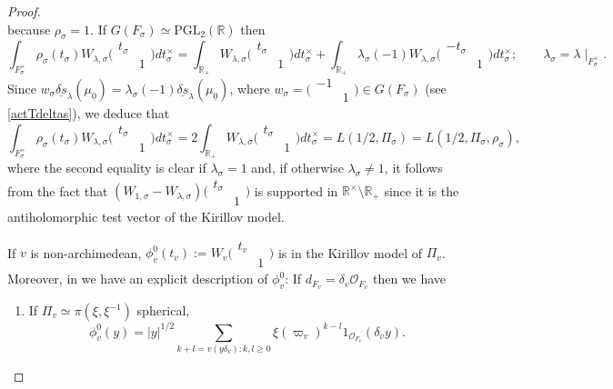 \documentclass{amsart}
\theoremstyle{definition}
\theoremstyle{remark}
\numberwithin{equation}{section}
\newcommand{\PGL}{{\mathrm{PGL}}}
\newcommand{\R}{{\mathbb R}}
\newcommand{\cO}{{\mathcal O}}
\begin{document}
\begin{proof}
\[\]
because $\rho_\sigma=1$.
If $G(F_\sigma)\simeq\PGL_2(\R)$ then
\[
\int_{F_\sigma^\times}\rho_\sigma(t_\sigma)W_{\lambda,\sigma}\big(\begin{smallmatrix}t_\sigma     &  \\     & 1    
\end{smallmatrix}\big)dt_\sigma^\times=\int_{\R_+}W_{\lambda,\sigma}\big(\begin{smallmatrix}t_\sigma     &  \\     & 1    
\end{smallmatrix}\big)dt_\sigma^\times+\int_{\R_+}\lambda_\sigma(-1)W_{\lambda,\sigma}\big(\begin{smallmatrix}-t_\sigma     &  \\     & 1    
\end{smallmatrix}\big)dt_\sigma^\times;\qquad\lambda_\sigma=\lambda\mid_{F_\sigma^\times}.
\]
Since $w_\sigma \underline{\delta s}_\lambda(\mu_{\underline{0}})=\lambda_\sigma(-1)\underline{\delta s}_\lambda(\mu_{\underline{0}})$, where $w_\sigma=\big(\begin{smallmatrix}-1     &  \\     & 1    
\end{smallmatrix}\big)\in G(F_\sigma)$ (see \eqref{actTdeltas}), we deduce that 
\[
\int_{F_\sigma^\times}\rho_\sigma(t_\sigma)W_{\lambda,\sigma}\big(\begin{smallmatrix}t_\sigma     &  \\     & 1    
\end{smallmatrix}\big)dt_\sigma^\times=2\int_{\R_+}W_{\lambda,\sigma}\big(\begin{smallmatrix}t_\sigma     &  \\     & 1    
\end{smallmatrix}\big)dt_\sigma^\times=L(1/2,\Pi_\sigma)=L(1/2,\Pi_\sigma, \rho_\sigma),
\]
where the second equality is clear if $\lambda_\sigma=1$ and, if otherwise $\lambda_\sigma\neq 1$, it follows from the fact that $(W_{1,\sigma}-W_{\lambda,\sigma})\big(\begin{smallmatrix}t_\sigma     &  \\     & 1    
\end{smallmatrix}\big)$ is supported in $\R^\times\setminus\R_+$ since it is the antiholomorphic test vector of the Kirillov model.

If $v$ is non-archimedean, $\phi^0_v(t_v):=W_v\big(\begin{smallmatrix}t_v     &  \\     & 1    
\end{smallmatrix}\big)$ is in the Kirillov model of $\Pi_v$.  Moreover, in \cite[P. 23]{Schmidt2002} we have an explicit description of $\phi_v^0$:
If $d_{F_v}=\delta_v\cO_{F_v}$ then we have 
\begin{enumerate}
    \item If $\Pi_v\simeq\pi(\xi,\xi^{-1})$ spherical, 
    \[
    \phi^0_v(y)=|y|^{1/2}\sum_{k+l=v(y\delta_v)\colon k,l\geq 0}\xi(\varpi_v)^{k-l}1_{\cO_{F_v}}(\delta_vy).
    \]


\end{enumerate}
\end{proof}
\end{document}
